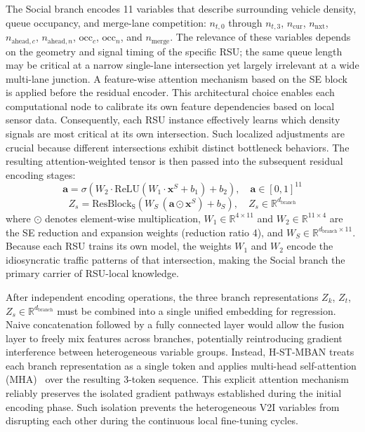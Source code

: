 \documentclass[journal]{IEEEtran}
\begin{document}
The Social branch encodes 11 variables that describe surrounding vehicle density, queue occupancy, and merge-lane competition:
$n_{t,0}$ through $n_{t,3}$, $n_\text{cur}$, $n_\text{nxt}$, $n_{\text{ahead},c}$, $n_{\text{ahead},n}$, $\text{occ}_c$, $\text{occ}_n$, and $n_\text{merge}$.
The relevance of these variables depends on the geometry and signal timing of the specific RSU; the same queue length may be critical at a narrow single-lane intersection yet largely irrelevant at a wide multi-lane junction.
A feature-wise attention mechanism based on the SE block~\cite{Hu2018SENet} is applied before the residual encoder.
This architectural choice enables each computational node to calibrate its own feature dependencies based on local sensor data.
Consequently, each RSU instance effectively learns which density signals are most critical at its own intersection.
Such localized adjustments are crucial because different intersections exhibit distinct bottleneck behaviors.
The resulting attention-weighted tensor is then passed into the subsequent residual encoding stages:
\begin{equation}
\mathbf{a} = \sigma\!\left(W_2 \cdot \text{ReLU}(W_1 \cdot \mathbf{x}^S + b_1) + b_2\right), \quad \mathbf{a} \in [0,1]^{11}
\label{eq:se_attn}
\end{equation}
\begin{equation}
Z_s = \text{ResBlock}_\text{S}\!\left(W_S\,(\mathbf{a} \odot \mathbf{x}^S) + b_S\right), \quad Z_s \in \mathbb{R}^{d_\text{branch}}
\label{eq:zs}
\end{equation}
where $\odot$ denotes element-wise multiplication, $W_1 \in \mathbb{R}^{4 \times 11}$ and $W_2 \in \mathbb{R}^{11 \times 4}$ are the SE reduction and expansion weights (reduction ratio 4), and $W_S \in \mathbb{R}^{d_\text{branch} \times 11}$.
Because each RSU trains its own model, the weights $W_1$ and $W_2$ encode the idiosyncratic traffic patterns of that intersection, making the Social branch the primary carrier of RSU-local knowledge.


After independent encoding operations, the three branch representations $Z_k$, $Z_t$, $Z_s \in \mathbb{R}^{d_\text{branch}}$ must be combined into a single unified embedding for regression.
Naive concatenation followed by a fully connected layer would allow the fusion layer to freely mix features across branches, potentially reintroducing gradient interference between heterogeneous variable groups.
Instead, H-ST-MBAN treats each branch representation as a single token and applies multi-head self-attention (MHA)~\cite{Vaswani2017} over the resulting 3-token sequence.
This explicit attention mechanism reliably preserves the isolated gradient pathways established during the initial encoding phase.
Such isolation prevents the heterogeneous V2I variables from disrupting each other during the continuous local fine-tuning cycles.
\end{document}
